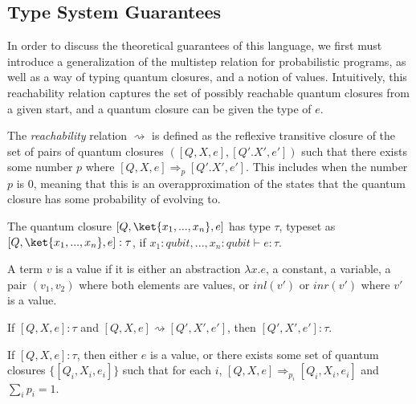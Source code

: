 \subsection{Type System Guarantees}
In order to discuss the theoretical guarantees of this language, we first must introduce a generalization of the multistep relation for probabilistic programs, as well as a way of typing quantum closures, and a notion of values.
Intuitively, this reachability relation captures the set of possibly reachable quantum closures from a given start, and a quantum closure can be given the type of $e$.
\begin{definition}
The \textit{reachability} relation $\rightsquigarrow$ is defined as the reflexive transitive closure of the set of pairs of quantum closures $([Q,X,e], [Q'.X',e'])$ such that there exists some number $p$ where $[Q,X,e]\Rightarrow_p [Q'.X',e']$.
This includes when the number $p$ is 0, meaning that this is an overapproximation of the states that the quantum closure has some probability of evolving to.
\end{definition}
\begin{definition}
    The quantum closure $[Q, \ket{x_1,...,x_n}, e]$ has type $\tau$, typeset as $[Q, \ket{x_1,...,x_n}, e]:\tau$, if $x_1 : qubit, ..., x_n : qubit \vdash e : \tau$.
\end{definition}
\begin{definition}
    A term $v$ is a value if it is either an abstraction $\lambda x. e$, a constant, a variable, a pair $(v_1,v_2)$ where both elements are values, or $inl(v')$ or $inr(v')$  where $v'$ is a value.
\end{definition}
\begin{theorem}[Preservation]
    If $[Q,X,e] : \tau$ and $[Q,X,e] \rightsquigarrow [Q',X',e']$, then $[Q',X',e'] : \tau$.
\end{theorem}
\begin{theorem}[Progress]
    If $[Q,X,e] : \tau$, then either $e$ is a value, or there exists some set of quantum closures $\{[Q_i,X_i,e_i]\}$ such that for each $i$, $[Q,X,e]\Rightarrow_{p_i}[Q_i,X_i,e_i]$ and $\sum_{i}p_i=1$.
\end{theorem}